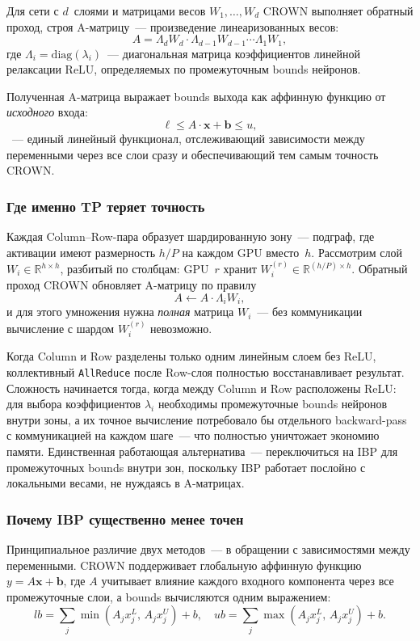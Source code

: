 Для сети с $d$~слоями и матрицами весов $W_1, \ldots, W_d$
CROWN выполняет обратный проход, строя A-матрицу~--- произведение
линеаризованных весов:
$$A = \Lambda_d W_d \cdot \Lambda_{d-1} W_{d-1} \cdots \Lambda_1 W_1,$$
где $\Lambda_i = \mathrm{diag}(\lambda_i)$~--- диагональная матрица
коэффициентов линейной релаксации ReLU, определяемых
по промежуточным bounds нейронов.

Полученная A-матрица выражает bounds выхода как аффинную функцию
от \textit{исходного} входа:
$$\ell \leq A \cdot \mathbf{x} + \mathbf{b} \leq u,$$
~--- единый линейный функционал, отслеживающий зависимости между
переменными через все слои сразу и обеспечивающий тем самым точность CROWN.

\subsubsection{Где именно TP теряет точность}

Каждая Column--Row-пара образует шардированную зону~--- подграф, где
активации имеют размерность $h/P$ на каждом GPU вместо~$h$.
Рассмотрим слой $W_i \in \mathbb{R}^{h \times h}$, разбитый по столбцам:
GPU~$r$ хранит $W_i^{(r)} \in \mathbb{R}^{(h/P) \times h}$.
Обратный проход CROWN обновляет A-матрицу по правилу
$$A \leftarrow A \cdot \Lambda_i W_i,$$
и для этого умножения нужна \textit{полная} матрица $W_i$~---
без коммуникации вычисление с шардом $W_i^{(r)}$ невозможно.

Когда Column и Row разделены только одним линейным слоем без ReLU,
коллективный \texttt{AllReduce} после Row-слоя полностью восстанавливает
результат. Сложность начинается тогда, когда между Column и Row
расположены ReLU: для выбора коэффициентов $\lambda_i$ необходимы
промежуточные bounds нейронов внутри зоны, а их точное вычисление
потребовало бы отдельного backward-pass с коммуникацией на каждом шаге~---
что полностью уничтожает экономию памяти.
Единственная работающая альтернатива~--- переключиться на IBP
для промежуточных bounds внутри зон, поскольку IBP работает послойно
с локальными весами, не нуждаясь в A-матрицах.

\subsubsection{Почему IBP существенно менее точен}

Принципиальное различие двух методов~--- в обращении с зависимостями
между переменными. CROWN поддерживает глобальную аффинную функцию
$y = A\mathbf{x} + \mathbf{b}$, где $A$ учитывает влияние каждого
входного компонента через все промежуточные слои, а bounds
вычисляются одним выражением:
$$lb = \sum_j \min(A_j x_j^L,\, A_j x_j^U) + b, \quad
  ub = \sum_j \max(A_j x_j^L,\, A_j x_j^U) + b.$$

